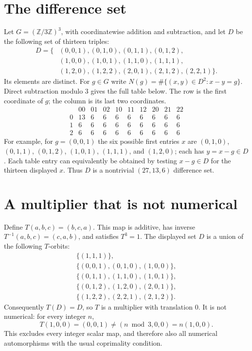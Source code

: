 \documentclass[11pt]{article}
\newcommand{\Z}{\mathbb Z}
\begin{document}
\section*{The difference set}
Let $G=(\Z/3\Z)^3$, with coordinatewise addition and subtraction,
and let $D$ be the following set of thirteen triples:
\[
\begin{split}
D=\{&(0,0,1),(0,1,0),(0,1,1),(0,1,2),\\
    &(1,0,0),(1,0,1),(1,1,0),(1,1,1),\\
    &(1,2,0),(1,2,2),(2,0,1),(2,1,2),(2,2,1)\}.
\end{split}
\]
Its elements are distinct. For $g\in G$ write
$N(g)=\#\{(x,y)\in D^2:x-y=g\}$. Direct subtraction modulo $3$
gives the full table below. The row is the first coordinate of $g$;
the column is its last two coordinates.
\[
\begin{array}{c|rrrrrrrrr}
 &00&01&02&10&11&12&20&21&22\\\hline
0&13&6&6&6&6&6&6&6&6\\
1&6&6&6&6&6&6&6&6&6\\
2&6&6&6&6&6&6&6&6&6
\end{array}
\]
For example, for $g=(0,0,1)$ the six possible first entries $x$
are $(0,1,0)$, $(0,1,1)$, $(0,1,2)$, $(1,0,1)$, $(1,1,1)$, and $(1,2,0)$;
each has $y=x-g\in D$. Each table entry can equivalently be obtained
by testing $x-g\in D$ for the thirteen displayed $x$.
Thus $D$ is a nontrivial $(27,13,6)$ difference set.

\section*{A multiplier that is not numerical}
Define $T(a,b,c)=(b,c,a)$. This map is additive, has inverse
$T^{-1}(a,b,c)=(c,a,b)$, and satisfies $T^3=1$. The displayed set
$D$ is a union of the following $T$-orbits:
\[
\begin{gathered}
\{(1,1,1)\},\\
\{(0,0,1),(0,1,0),(1,0,0)\},\\
\{(0,1,1),(1,1,0),(1,0,1)\},\\
\{(0,1,2),(1,2,0),(2,0,1)\},\\
\{(1,2,2),(2,2,1),(2,1,2)\}.
\end{gathered}
\]
Consequently $T(D)=D$, so $T$ is a multiplier with translation $0$.
It is not numerical: for every integer $n$,
\[
 T(1,0,0)=(0,0,1)\ne(n\bmod3,0,0)=n(1,0,0).
\]
This excludes every integer scalar map, and therefore also all
numerical automorphisms with the usual coprimality condition.
\end{document}
